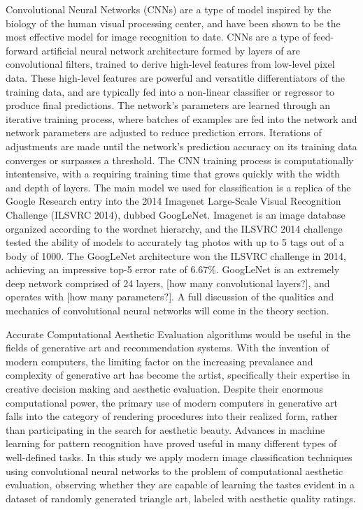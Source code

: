 \documentclass[midd]{thesis}
\begin{document}
Convolutional Neural Networks (CNNs) are a type of model inspired by the biology of the human visual processing center, and have been shown to be the most effective model for image recognition to date. CNNs are a type of feed-forward artificial neural network architecture formed by layers of are convolutional filters, trained to derive high-level features from low-level pixel data. These high-level features are powerful and versatitle differentiators of the training data, and are typically fed into a non-linear classifier or regressor to produce final predictions. The network's parameters are learned through an iterative training process, where batches of examples are fed into the network and network parameters are adjusted to reduce prediction errors. Iterations of adjustments are made until the network's prediction accuracy on its training data converges or surpasses a threshold. The CNN training process is computationally intentensive, with a requiring training time that grows quickly with the width and depth of layers. The main model we used for classification is a replica of the Google Research entry into the 2014 Imagenet Large-Scale Visual Recognition Challenge (ILSVRC 2014), dubbed GoogLeNet. Imagenet is an image database organized according to the wordnet hierarchy, and the ILSVRC 2014 challenge tested the ability of models to accurately tag photos with up to 5 tags out of a body of 1000. The GoogLeNet architecture won the ILSVRC challenge in 2014, achieving an impressive top-5 error rate of 6.67\%. GoogLeNet is an extremely deep network comprised of 24 layers, [how many convolutional layers?], and operates with [how many parameters?]. A full discussion of the qualities and mechanics of convolutional neural networks will come in the theory section.

Accurate Computational Aesthetic Evaluation algorithms would be useful in the fields of generative art and recommendation systems. With the invention of modern computers, the limiting factor on the increasing prevalance and complexity of generative art has become the artist, specifically their expertise in creative decision making and aesthetic evaluation. Despite their enormous computational power, the primary use of modern computers in generative art falls into the category of rendering procedures into their realized form, rather than participating in the search for aesthetic beauty. Advances in machine learning for pattern recognition have proved useful in many different types of well-defined tasks. In this study we apply modern image classification techniques using convolutional neural networks to the problem of computational aesthetic evaluation, observing whether they are capable of learning the tastes evident in a dataset of randomly generated triangle art, labeled with aesthetic quality ratings.
\end{document}
